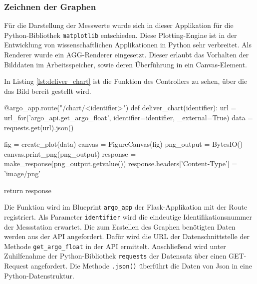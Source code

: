 \subsubsection{Zeichnen der Graphen} \label{sec:ImplementierungPLOTS}


Für die Darstellung der Messwerte wurde sich in dieser Applikation für die Python-Bibliothek \texttt{matplotlib} entschieden.  Diese Plotting-Engine ist in der Entwicklung von wissenschaftlichen Applikationen in Python sehr verbreitet.
Als Renderer wurde ein AGG-Renderer eingesetzt. Dieser erlaubt das Vorhalten der Bilddaten im Arbeitsspeicher, sowie deren Überführung in ein Canvas-Element.

In Listing \ref{lst:deliver_chart} ist die Funktion des Controllers zu sehen, über die das Bild bereit gestellt wird.

\begin{python}[label={lst:deliver_chart}, caption={Ausliefern eines Funktionsplots Flask}]
@argo_app.route("/chart/<identifier>")
def deliver_chart(identifier):
    url = url_for('argo_api.get_argo_float', identifier=identifier, _external=True)
    data = requests.get(url).json()

    fig = create_plot(data)
    canvas = FigureCanvas(fig)
    png_output = BytesIO()
    canvas.print_png(png_output)
    response = make_response(png_output.getvalue())
    response.headers['Content-Type'] = 'image/png'

    return response
\end{python}

Die Funktion wird im Blueprint \texttt{argo\_app} der Flask-Applikation mit der Route registriert. Als Parameter \texttt{identifier}  wird die eindeutige Identifikationsnummer der Messstation erwartet. Die zum Erstellen des Graphen benötigten Daten werden aus der API angefordert. Dafür wird die URL der Datenschnittstelle der Methode \texttt{get\_argo\_float} in der API ermittelt. Anschließend wird unter Zuhilfenahme der Python-Bibliothek \texttt{requests} der Datensatz über einen GET-Request angefordert. Die Methode \texttt{.json()} überführt die Daten von Json in eine Python-Datenstruktur.

